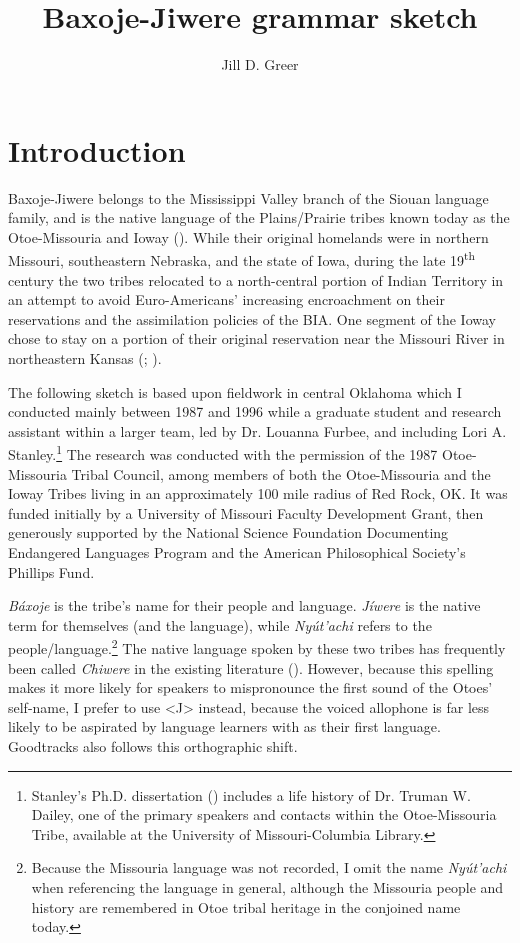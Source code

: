 \documentclass[output=paper]{LSP/langsci}
\author{Jill D. Greer}
\title{{Baxoje-Jiwere} grammar sketch }
\begin{document}
\section{Introduction}

Baxoje-Jiwere belongs to the Mississippi Valley branch of the Siouan language family, and is the native language of the Plains/Prairie tribes known today as the Otoe-Missouria and Ioway (\citealt[3,8]{Goddard1996}).  While their original homelands were in northern Missouri, southeastern Nebraska, and the state of Iowa, during the late 19\textsuperscript{th} century the two tribes relocated to a north-central portion of Indian Territory in an attempt to avoid Euro-Americans' increasing encroachment on their reservations and the assimilation policies of the BIA.  One segment of the Ioway chose to stay on a portion of their original reservation near the Missouri River in northeastern Kansas (\citealt{Wedel2001}; \citealt{Schweitzer2001}).  

The following sketch is based upon fieldwork in central Oklahoma which I conducted mainly between 1987 and 1996 while a graduate student and research assistant within a larger team, led by Dr. Louanna Furbee, and including Lori A. Stanley.\footnote {Stanley's Ph.D. dissertation (\citet{Stanley1993}) includes a life history of Dr. Truman W. Dailey, one of the primary speakers and contacts within the Otoe-Missouria Tribe, available at the University of Missouri-Columbia Library.} The research was conducted with the permission of the 1987 Otoe-Missouria Tribal Council, among members of both the Otoe-Missouria and the Ioway Tribes living in an approximately 100 mile radius of Red Rock, OK.  It was funded initially by a University of Missouri Faculty Development Grant, then generously supported by the National Science Foundation Documenting Endangered Languages Program and the American Philosophical Society's Phillips Fund.

\emph{Báxoje} is the  tribe's name for their people and language.  \emph{J\'iwere} is the native  term for themselves (and the language), while \emph{Nyút'achi} refers to the  people/language.\footnote{Because the Missouria language was not recorded, I omit the name \emph{Nyút'achi} when referencing the language in general, although the Missouria people and history are remembered in Otoe tribal heritage in the conjoined name today.} The native language spoken by these two tribes has frequently been called \textit{Chiwere} in the existing literature (\citealt{Whitman1947, Marsh1936, Wedel2001, Schweitzer2001}).  However, because this spelling makes it more likely for  speakers to mispronounce the first sound of the Otoes' self-name, I prefer to use <J> instead, because the voiced allophone is far less likely to be aspirated by language learners with  as their first language. Goodtracks also follows this orthographic shift.  
\end{document}
